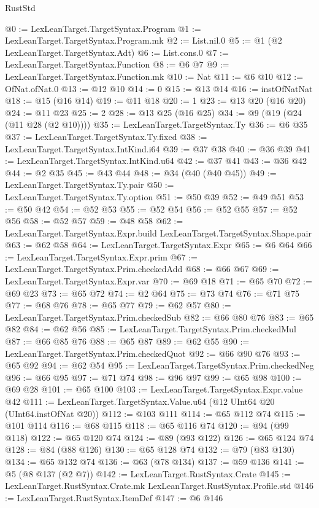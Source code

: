 \begin{lexlean}{RustStd}
\begin{coremodule}
@0 := LexLeanTarget.TargetSyntax.Program
@1 := LexLeanTarget.TargetSyntax.Program.mk
@2 := List.nil.{0}
@5 := @1 (@2 LexLeanTarget.TargetSyntax.Adt)
@6 := List.cons.{0}
@7 := LexLeanTarget.TargetSyntax.Function
@8 := @6 @7
@9 := LexLeanTarget.TargetSyntax.Function.mk
@10 := Nat
@11 := @6 @10
@12 := OfNat.ofNat.{0}
@13 := @12 @10
@14 := 0
@15 := @13 @14
@16 := instOfNatNat
@18 := @15 (@16 @14)
@19 := @11 @18
@20 := 1
@23 := @13 @20 (@16 @20)
@24 := @11 @23
@25 := 2
@28 := @13 @25 (@16 @25)
@34 := @9 (@19 (@24 (@11 @28 (@2 @10))))
@35 := LexLeanTarget.TargetSyntax.Ty
@36 := @6 @35
@37 := LexLeanTarget.TargetSyntax.Ty.fixed
@38 := LexLeanTarget.TargetSyntax.IntKind.i64
@39 := @37 @38
@40 := @36 @39
@41 := LexLeanTarget.TargetSyntax.IntKind.u64
@42 := @37 @41
@43 := @36 @42
@44 := @2 @35
@45 := @43 @44
@48 := @34 (@40 (@40 @45))
@49 := LexLeanTarget.TargetSyntax.Ty.pair
@50 := LexLeanTarget.TargetSyntax.Ty.option
@51 := @50 @39
@52 := @49 @51
@53 := @50 @42
@54 := @52 @53
@55 := @52 @54
@56 := @52 @55
@57 := @52 @56
@58 := @52 @57
@59 := @48 @58
@62 := LexLeanTarget.TargetSyntax.Expr.build LexLeanTarget.TargetSyntax.Shape.pair
@63 := @62 @58
@64 := LexLeanTarget.TargetSyntax.Expr
@65 := @6 @64
@66 := LexLeanTarget.TargetSyntax.Expr.prim
@67 := LexLeanTarget.TargetSyntax.Prim.checkedAdd
@68 := @66 @67
@69 := LexLeanTarget.TargetSyntax.Expr.var
@70 := @69 @18
@71 := @65 @70
@72 := @69 @23
@73 := @65 @72
@74 := @2 @64
@75 := @73 @74
@76 := @71 @75
@77 := @68 @76
@78 := @65 @77
@79 := @62 @57
@80 := LexLeanTarget.TargetSyntax.Prim.checkedSub
@82 := @66 @80 @76
@83 := @65 @82
@84 := @62 @56
@85 := LexLeanTarget.TargetSyntax.Prim.checkedMul
@87 := @66 @85 @76
@88 := @65 @87
@89 := @62 @55
@90 := LexLeanTarget.TargetSyntax.Prim.checkedQuot
@92 := @66 @90 @76
@93 := @65 @92
@94 := @62 @54
@95 := LexLeanTarget.TargetSyntax.Prim.checkedNeg
@96 := @66 @95
@97 := @71 @74
@98 := @96 @97
@99 := @65 @98
@100 := @69 @28
@101 := @65 @100
@103 := LexLeanTarget.TargetSyntax.Expr.value @42
@111 := LexLeanTarget.TargetSyntax.Value.u64 (@12 UInt64 @20 (UInt64.instOfNat @20))
@112 := @103 @111
@114 := @65 @112 @74
@115 := @101 @114
@116 := @68 @115
@118 := @65 @116 @74
@120 := @94 (@99 @118)
@122 := @65 @120 @74
@124 := @89 (@93 @122)
@126 := @65 @124 @74
@128 := @84 (@88 @126)
@130 := @65 @128 @74
@132 := @79 (@83 @130)
@134 := @65 @132 @74
@136 := @63 (@78 @134)
@137 := @59 @136
@141 := @5 (@8 @137 (@2 @7))
@142 := LexLeanTarget.RustSyntax.Crate
@145 := LexLeanTarget.RustSyntax.Crate.mk LexLeanTarget.RustSyntax.Profile.std
@146 := LexLeanTarget.RustSyntax.ItemDef
@147 := @6 @146

\end{coremodule}
\end{lexlean}
